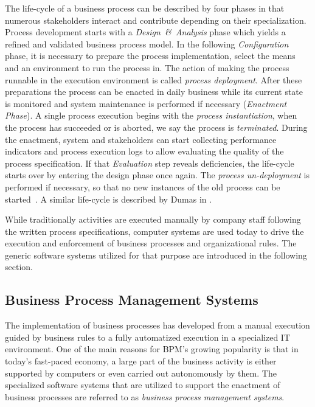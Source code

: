\noindent
The life-cycle of a business process can be described by four phases in that numerous stakeholders interact and contribute depending on their specialization.
Process development starts with a \emph{Design~\&~Analysis} phase which yields a refined and validated business process model.
In the following \emph{Configuration} phase, it is necessary to prepare the process implementation, select the means and an environment to run the process in.
The action of making the process runnable in the execution environment is called \emph{process deployment}.
After these preparations the process can be enacted in daily business while its current state is monitored and system maintenance is performed if necessary (\emph{Enactment Phase}). 
A single process execution begins with the \emph{process instantiation}, when the process has succeeded or is aborted, we say the process is \emph{terminated}.
During the enactment, system and stakeholders can start collecting performance indicators and process execution logs to allow evaluating the quality of the process specification. If that \emph{Evaluation} step reveals deficiencies, the life-cycle starts over by entering the design phase once again.
The \emph{process un-deployment} is performed if necessary, so that no new instances of the old process can be started~\cite[p.~11~ff.]{weske:bpm-book}. A similar life-cycle is described by Dumas in \cite{dumas:bpm}.

While traditionally activities are executed manually by company staff following the written process specifications, computer systems are used today to drive the execution and enforcement of business processes and organizational rules.
The generic software systems utilized for that purpose are introduced in the following section.

\subsection{Business Process Management Systems}\label{ch:bg:bpms}
The implementation of business processes has developed from a manual execution guided by business rules to a fully automatized execution in a specialized IT environment.
One of the main reasons for \acs{BPM}'s growing popularity is that in today's fast-paced economy, a large part of the business activity is either supported by computers or even carried out autonomously by them.
The specialized software systems that are utilized to support the enactment of business processes are referred to as \emph{business process management systems}.


